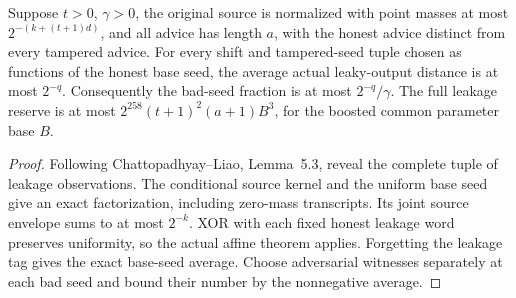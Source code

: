 \begin{theorem}
  \label{thm:lowerbounds-algebraic-affine-leakage}
  \leanok
  Suppose $t>0$, $\gamma>0$, the original source is normalized with point
  masses at most $2^{-(k+(t+1)d)}$, and all advice has length $a$, with
  the honest advice distinct from every tampered advice. For every shift
  and tampered-seed tuple chosen as functions of the honest base seed,
  the average actual leaky-output distance is at most $2^{-q}$.
  Consequently the bad-seed fraction is at most $2^{-q}/\gamma$.
  The full leakage reserve is at most
  $2^{258}(t+1)^2(a+1)B^3$, for the boosted common parameter base $B$.
\end{theorem}
\begin{proof}
  \leanok
  Following Chattopadhyay--Liao, Lemma~5.3, reveal the complete tuple of
  leakage observations. The conditional source kernel and the uniform
  base seed give an exact factorization, including zero-mass transcripts.
  Its joint source envelope sums to at most $2^{-k}$. XOR with each fixed
  honest leakage word preserves uniformity, so the actual affine theorem
  applies. Forgetting the leakage tag gives the exact base-seed average.
  Choose adversarial witnesses separately at each bad seed and bound
  their number by the nonnegative average.
\end{proof}

